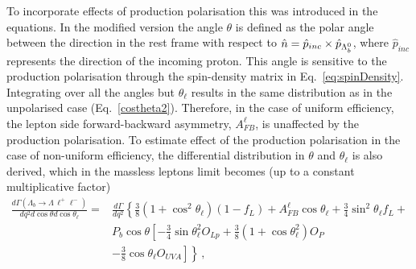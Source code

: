 To incorporate effects of production polarisation this was introduced in the equations.
%
In the modified version the angle $\theta$ is defined as the polar angle between the \Lz direction
in the \Lb rest frame with respect to $\hat{n} = \hat{p}_{inc} \times \hat{p}_{\Lambda^0_b}$, where $\hat{p}_{inc}$
represents the direction of the incoming proton. This angle is sensitive to the production polarisation
through the spin-density matrix in Eq.~\ref{eq:spinDensity}.
Integrating over all the angles but $\theta_\ell$ results in 
the same distribution as in the unpolarised case (Eq.~\ref{costheta2}). Therefore, in the case of uniform
efficiency, the lepton side forward-backward asymmetry, $A_{FB}^\ell$, is unaffected by the production
polarisation. To estimate effect of the production polarisation in the case of non-uniform efficiency, 
the differential distribution in $\theta$ and $\theta_\ell$ is also derived, which in the massless leptons
limit becomes (up to a  constant multiplicative factor)
%
\begin{align}
\frac{d\Gamma(\Lambda_{b}\to \Lambda \,\ell^{+}\ell^{-})}{dq^2d\cos\theta d\cos\theta_\ell}=&
\frac{d\Gamma}{dq^2}\left\{  \frac{3}{8}\left(1+\cos^2\theta_\ell\right)(1-f_L)+A_{FB}^\ell\cos\theta_\ell +
   \frac{3}{4}\sin^2\theta_\ell f_L+\right. \nonumber \\
&P_b\cos\theta\left[ -\frac{3}{4}\sin\theta_\ell^2O_{Lp}+
  \frac{3}{8}\left(1+\cos\theta_\ell^2\right)O_P\right. \nonumber \\
&\left.\left.-\frac{3}{8}\cos\theta_\ell O_{UVA} \right]\right\}\,,
\label{eq:lepton2D}
\end{align}
